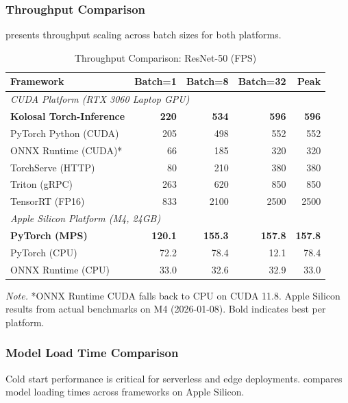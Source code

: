 \documentclass[10pt,twocolumn,a4paper]{article}
\theoremstyle{definition}
\theoremstyle{plain}
\begin{document}
\subsubsection{Throughput Comparison}

 presents throughput scaling across batch sizes for both platforms.

\begin{table}[t]
\centering
\caption{Throughput Comparison: ResNet-50 (FPS)}
\label{tab:throughput_comparison}
\scriptsize
\setlength{\tabcolsep}{3pt}
\begin{tabular}{@{}lrrrr@{}}
\toprule
\textbf{Framework} & \textbf{Batch=1} & \textbf{Batch=8} & \textbf{Batch=32} & \textbf{Peak} \\
\midrule
\multicolumn{5}{l}{\textit{CUDA Platform (RTX 3060 Laptop GPU)}} \\
\textbf{Kolosal Torch-Inference} & \textbf{220} & \textbf{534} & \textbf{596} & \textbf{596} \\
PyTorch Python (CUDA) & 205 & 498 & 552 & 552 \\
ONNX Runtime (CUDA)* & 66 & 185 & 320 & 320 \\
TorchServe (HTTP) & 80 & 210 & 380 & 380 \\
Triton (gRPC) & 263 & 620 & 850 & 850 \\
TensorRT (FP16) & 833 & 2100 & 2500 & 2500 \\
\midrule
\multicolumn{5}{l}{\textit{Apple Silicon Platform (M4, 24GB)}} \\
\textbf{PyTorch (MPS)} & \textbf{120.1} & \textbf{155.3} & \textbf{157.8} & \textbf{157.8} \\
PyTorch (CPU) & 72.2 & 78.4 & 12.1 & 78.4 \\
ONNX Runtime (CPU) & 33.0 & 32.6 & 32.9 & 33.0 \\
\bottomrule
\end{tabular}

\vspace{0.5em}
\noindent\textit{Note.} *ONNX Runtime CUDA falls back to CPU on CUDA 11.8. Apple Silicon results from actual benchmarks on M4 (2026-01-08). Bold indicates best per platform.
\end{table}

\subsubsection{Model Load Time Comparison}

Cold start performance is critical for serverless and edge deployments.  compares model loading times across frameworks on Apple Silicon.
\end{document}
